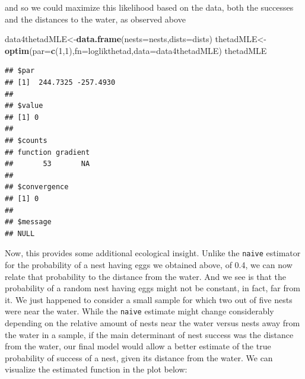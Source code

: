 \documentclass[
]{book}
\newenvironment{Shaded}{\begin{snugshade}}{\end{snugshade}}
\newcommand{\AttributeTok}[1]{\textcolor[rgb]{0.13,0.29,0.53}{#1}}
\newcommand{\DecValTok}[1]{\textcolor[rgb]{0.00,0.00,0.81}{#1}}
\newcommand{\FloatTok}[1]{\textcolor[rgb]{0.00,0.00,0.81}{#1}}
\newcommand{\FunctionTok}[1]{\textcolor[rgb]{0.13,0.29,0.53}{\textbf{#1}}}
\newcommand{\NormalTok}[1]{#1}
\newcommand{\OtherTok}[1]{\textcolor[rgb]{0.56,0.35,0.01}{#1}}
\newcommand{\SpecialCharTok}[1]{\textcolor[rgb]{0.81,0.36,0.00}{\textbf{#1}}}
\newcommand{\StringTok}[1]{\textcolor[rgb]{0.31,0.60,0.02}{#1}}
\begin{document}
and so we could maximize this likelihood based on the data, both the successes and the distances to the water, as observed above

\begin{Shaded}
\begin{Highlighting}[]
\NormalTok{data4thetadMLE}\OtherTok{\textless{}{-}}\FunctionTok{data.frame}\NormalTok{(}\AttributeTok{nests=}\NormalTok{nests,}\AttributeTok{dists=}\NormalTok{dists)}
\NormalTok{thetadMLE}\OtherTok{\textless{}{-}}\FunctionTok{optim}\NormalTok{(}\AttributeTok{par=}\FunctionTok{c}\NormalTok{(}\DecValTok{1}\NormalTok{,}\DecValTok{1}\NormalTok{),}\AttributeTok{fn=}\NormalTok{loglikthetad,}\AttributeTok{data=}\NormalTok{data4thetadMLE)}
\NormalTok{thetadMLE}
\end{Highlighting}
\end{Shaded}

\begin{verbatim}
## $par
## [1]  244.7325 -257.4930
## 
## $value
## [1] 0
## 
## $counts
## function gradient 
##       53       NA 
## 
## $convergence
## [1] 0
## 
## $message
## NULL
\end{verbatim}

Now, this provides some additional ecological insight. Unlike the \texttt{naive} estimator for the probability of a nest having eggs we obtained above, of 0.4, we can now relate that probability to the distance from the water. And we see is that the probability of a random nest having eggs might not be constant, in fact, far from it. We just happened to consider a small sample for which two out of five nests were near the water. While the \texttt{naive} estimate might change considerably depending on the relative amount of nests near the water versus nests away from the water in a sample, if the main determinant of nest success was the distance from the water, our final model would allow a better estimate of the true probability of success of a nest, given its distance from the water. We can visualize the estimated function in the plot below:

\begin{Shaded}
\end{Shaded}
\end{document}
